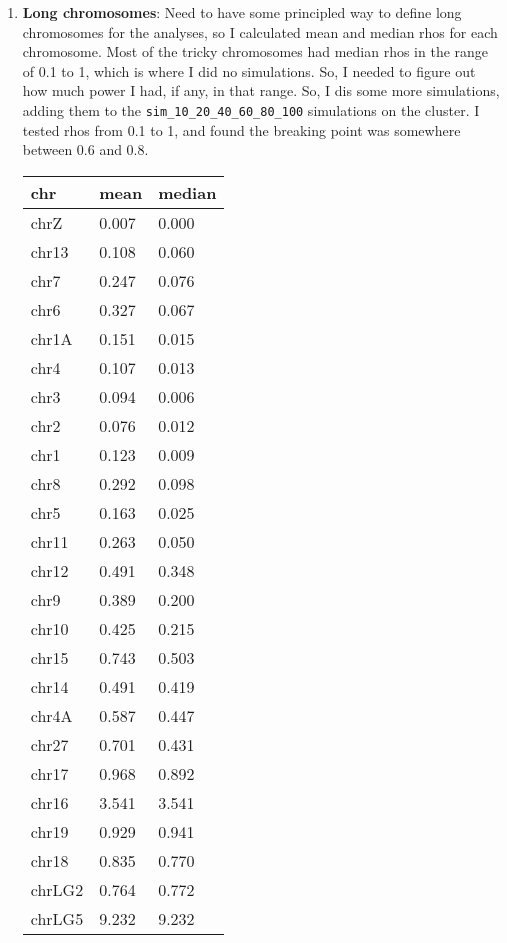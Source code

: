 \documentclass[idxtotoc,hyperref,openany,oneside]{labbook} %
\begin{document}
\begin{enumerate}
\item \textbf{Long chromosomes}: Need to have some principled way to define long chromosomes for the analyses, so I calculated mean and median rhos for each chromosome. Most of the tricky chromosomes had median rhos in the range of 0.1 to 1, which is where I did no simulations. So, I needed to figure out how much power I had, if any, in that range. So, I dis some more simulations, adding them to the \verb+sim_10_20_40_60_80_100+ simulations on the cluster. I tested rhos from 0.1 to 1, and found the breaking point was somewhere between 0.6 and 0.8.
\begin{table}[H]
\begin{tabular}{lll}
\hline
chr      & mean  & median \\
\hline
chrZ     & 0.007 & 0.000  \\
chr13    & 0.108 & 0.060  \\
chr7     & 0.247 & 0.076  \\
chr6     & 0.327 & 0.067  \\
chr1A    & 0.151 & 0.015  \\
chr4     & 0.107 & 0.013  \\
chr3     & 0.094 & 0.006  \\
chr2     & 0.076 & 0.012  \\
chr1     & 0.123 & 0.009  \\
chr8     & 0.292 & 0.098  \\
chr5     & 0.163 & 0.025  \\
chr11    & 0.263 & 0.050  \\
chr12    & 0.491 & 0.348  \\
chr9     & 0.389 & 0.200  \\
chr10    & 0.425 & 0.215  \\
chr15    & 0.743 & 0.503  \\
chr14    & 0.491 & 0.419  \\
chr4A    & 0.587 & 0.447  \\
chr27    & 0.701 & 0.431  \\
\hline
chr17    & 0.968 & 0.892  \\
chr16    & 3.541 & 3.541  \\
chr19    & 0.929 & 0.941  \\
chr18    & 0.835 & 0.770  \\
chrLG2   & 0.764 & 0.772  \\
chrLG5   & 9.232 & 9.232  \\

\end{tabular}
\end{table}
\end{enumerate}
\end{document}
